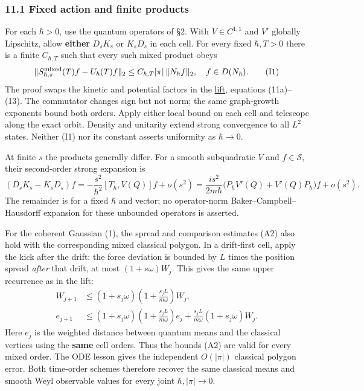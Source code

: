 \documentclass[11pt,a4paper]{article}
\begin{document}
\hypertarget{fixed-action-and-finite-products}{%
\subsubsection{11.1 Fixed action and finite
products}\label{fixed-action-and-finite-products}}

For each \(\hbar>0\), use the quantum operators of §2. With
\(V\in C^{1,1}\) and \(V'\) globally Lipschitz, allow \textbf{either}
\(D_sK_s\) or \(K_sD_s\) in each cell. For every fixed \(\hbar,T>0\)
there is a finite \(C_{\hbar,T}\) such that every such mixed product
obeys \[
 \|S_{\hbar,\pi}^{\rm mixed}(T)f-U_\hbar(T)f\|_2
 \le C_{\hbar,T}|\pi|\,\|N_\hbar f\|_2,\quad f\in D(N_\hbar). \tag{I1}
\] The proof swaps the kinetic and potential factors in the
\href{lipschitz-certificate-quantum-lift.md}{lift}, equations
(11a)--(13). The commutator changes sign but not norm; the same
graph-growth exponents bound both orders. Apply either local bound on
each cell and telescope along the exact orbit. Density and unitarity
extend strong convergence to all \(L^2\) states. Neither (I1) nor its
constant asserts uniformity as \(\hbar\to0\).

At finite \(s\) the products generally differ. For a smooth subquadratic
\(V\) and \(f\in\mathcal S\), their second-order strong expansion is \[
 (D_sK_s-K_sD_s)f
 =-\frac{s^2}{\hbar^2}[T_\hbar,V(Q)]f+o(s^2)
 =\frac{is^2}{2m\hbar}
       \big(P_\hbar V'(Q)+V'(Q)P_\hbar\big)f+o(s^2). \tag{I1a}
\] The remainder is for a fixed \(\hbar\) and vector; no operator-norm
Baker--Campbell--Hausdorff expansion for these unbounded operators is
asserted.

For the coherent Gaussian (1), the spread and comparison estimates (A2)
also hold with the corresponding mixed classical polygon. In a
drift-first cell, apply the kick after the drift: the force deviation is
bounded by \(L\) times the position spread \emph{after} that drift, at
most \((1+s\omega)W_j\). This gives the same upper recurrence as in the
lift: \[
 \begin{aligned}
 W_{j+1}&\le(1+s_j\omega)
          \left(1+\frac{s_jL}{m\omega}\right)W_j,\\
 e_{j+1}&\le(1+s_j\omega)
          \left(1+\frac{s_jL}{m\omega}\right)e_j+
          \frac{s_jL}{m\omega}(1+s_j\omega)W_j.
 \end{aligned} \tag{I2}
\] Here \(e_j\) is the weighted distance between quantum means and the
classical vertices using the \textbf{same} cell orders. Thus the bounds
(A2) are valid for every mixed order. The ODE lesson gives the
independent \(O(|\pi|)\) classical polygon error. Both time-order
schemes therefore recover the same classical means and smooth Weyl
observable values for every joint \(\hbar,|\pi|\to0\).
\end{document}
